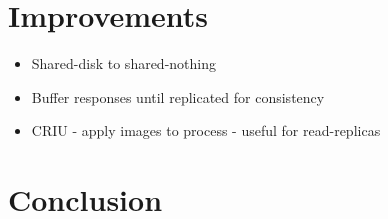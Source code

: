 \documentclass[draft]{proc}
\newcommand{\bit}{\begin{itemize}}
\newcommand{\eit}{\end{itemize}}
\begin{document}
\section{Improvements}

\bit
  \item Shared-disk to shared-nothing
  \item Buffer responses until replicated for consistency
  \item CRIU - apply images to process - useful for read-replicas
\eit

\section{Conclusion}

\printbibliography
\end{document}
